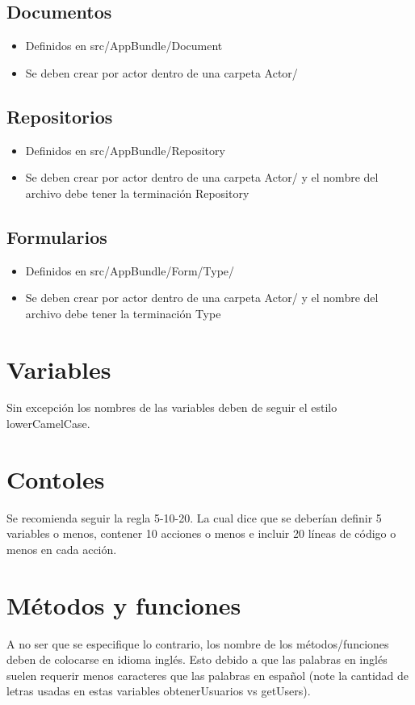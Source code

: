 \subsection{Documentos}
\begin{itemize}
\item Definidos en src/AppBundle/Document

\item Se deben crear por actor dentro de una carpeta Actor/ 

\end{itemize}
\subsection{Repositorios}
\begin{itemize}
\item Definidos en src/AppBundle/Repository

\item Se deben crear por actor dentro de una carpeta Actor/ y el nombre del archivo debe tener la terminación Repository

\end{itemize}
\subsection{Formularios}
\begin{itemize}
\item Definidos en src/AppBundle/Form/Type/

\item Se deben crear por actor dentro de una carpeta Actor/ y el nombre del archivo debe tener la terminación Type

\end{itemize}

\section{Variables}
Sin excepción los nombres de las variables deben de seguir el estilo lowerCamelCase.

\section{Contoles}
Se recomienda seguir la regla 5-10-20. La cual dice que se deberían definir 5 variables o menos, contener 10 acciones o menos e incluir 20 líneas de código o menos en cada acción.

\section{Métodos y funciones}
A no ser que se especifique lo contrario, los nombre de los métodos/funciones deben de colocarse en idioma inglés. Esto debido a que las palabras en inglés suelen requerir menos caracteres que las palabras en español (note la cantidad de letras usadas en estas variables obtenerUsuarios vs getUsers).
\newpage
